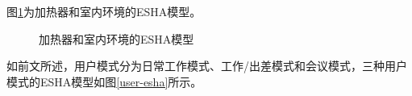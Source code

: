 	图\ref{heater-esha}为加热器和室内环境的ESHA模型。
	
	\begin{figure}
	\centering
	\caption{加热器和室内环境的ESHA模型}
	\label{heater-esha}
	\end{figure}

	如前文所述，用户模式分为日常工作模式、工作/出差模式和会议模式，三种用户模式的ESHA模型如图\ref{user-esha}所示。
	
